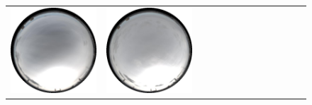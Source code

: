 \begin{figure}
\begin{tabular}{@{}rcccccccccccc@{}}
    \includegraphics[width=\customwidth]{./figures/database/20141108_130025.jpg} &
    \includegraphics[width=\customwidth]{./figures/database/20141108_133025.jpg} &

\end{tabular}
\end{figure}

